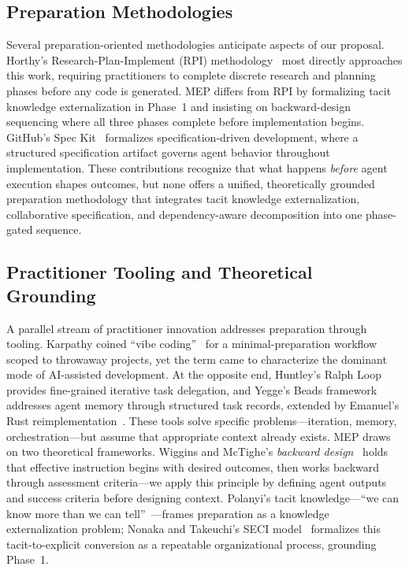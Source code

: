 \subsection{Preparation Methodologies}

Several preparation-oriented methodologies anticipate aspects of our
proposal. Horthy's Research-Plan-Implement (RPI)
methodology~\cite{horthy2025rpi} most directly approaches this work,
requiring practitioners to complete discrete research and planning
phases before any code is generated. MEP differs from RPI by
formalizing tacit knowledge externalization in Phase~1 and insisting on
backward-design sequencing where all three phases complete before
implementation begins. GitHub's Spec Kit~\cite{github2025speckit}
formalizes specification-driven development, where a structured
specification artifact governs agent behavior throughout
implementation. These contributions recognize that what happens
\emph{before} agent execution shapes outcomes, but none offers a
unified, theoretically grounded preparation methodology that
integrates tacit knowledge externalization, collaborative
specification, and dependency-aware decomposition into one phase-gated
sequence.

\subsection{Practitioner Tooling and Theoretical Grounding}

A parallel stream of practitioner innovation addresses preparation
through tooling. Karpathy coined ``vibe coding''~\cite{karpathy2025vibe}
for a minimal-preparation workflow scoped to throwaway projects, yet the
term came to characterize the dominant mode of AI-assisted development.
At the opposite end, Huntley's Ralph Loop~\cite{huntley2025ralph}
provides fine-grained iterative task delegation, and Yegge's Beads
framework~\cite{yegge2025beads} addresses agent memory through
structured task records, extended by Emanuel's Rust
reimplementation~\cite{emanuel2025beadsrust}. These tools solve specific
problems---iteration, memory, orchestration---but assume that
appropriate context already exists. MEP draws on two theoretical
frameworks. Wiggins and McTighe's
\emph{backward design}~\cite{wiggins1998understanding} holds that
effective instruction begins with desired outcomes, then works backward
through assessment criteria---we apply this principle by defining
agent outputs and success criteria before designing context. Polanyi's
tacit knowledge---``we can know more than we can
tell''~\cite{polanyi1966tacit, polanyi1958personal}---frames preparation
as a knowledge externalization problem; Nonaka and Takeuchi's SECI
model~\cite{nonaka1995knowledge} formalizes this tacit-to-explicit
conversion as a repeatable organizational process, grounding Phase~1.

